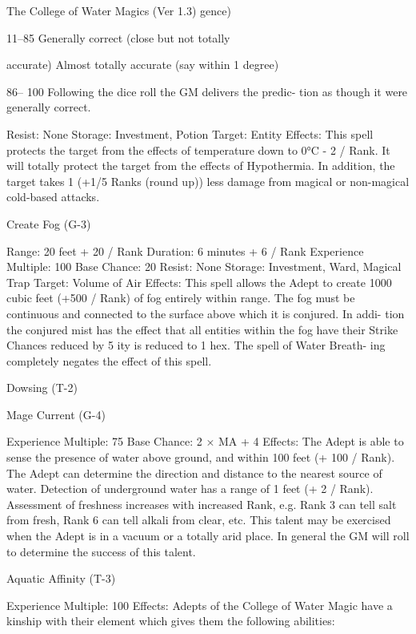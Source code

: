 \begin{Chapter}{The College of Water Magics (Ver 1.3)}
gence) 

11–85  Generally correct (close but not totally 

accurate) 
Almost totally accurate (say within 1 
degree) 

86–
100 
Following the dice roll the GM delivers the predic-
tion as though it were generally correct. 

Resist: None 
Storage: Investment, Potion 
Target: Entity 
Effects:  This  spell  protects  the  target  from  the 
effects  of  temperature  down  to  0°C  -  2  /  Rank.  It 
will  totally  protect  the  target  from  the  effects  of 
Hypothermia.  In  addition,  the  target  takes  1  (+1/5 
Ranks  (round  up))  less  damage  from  magical  or 
non-magical cold-based attacks. 

Create Fog (G-3) 

Range: 20 feet + 20 / Rank 
Duration: 6 minutes + 6 / Rank 
Experience Multiple: 100 
Base Chance: 20%
Resist: None 
Storage: Investment, Ward, Magical Trap 
Target: Volume of Air 
Effects: This spell allows the Adept to create 1000 
cubic  feet  (+500  /  Rank)  of  fog  entirely  within 
range.  The  fog  must  be  continuous  and  connected 
to  the  surface  above  which  it  is conjured.  In  addi-
tion the conjured mist has the effect that all entities 
within  the  fog  have  their  Strike  Chances  reduced 
by 5%
ity is reduced to 1 hex. The spell of Water Breath-
ing completely negates the effect of this spell. 

Dowsing (T-2) 

Mage Current (G-4) 

Experience Multiple: 75 
Base Chance: 2 × MA + 4%
Effects: The Adept is able to sense the presence of 
water  above  ground,  and  within  100  feet  (+  100  / 
Rank).  The  Adept  can determine  the direction and 
distance  to  the  nearest  source  of  water.  Detection 
of  underground  water  has  a  range  of  1  feet  (+  2  / 
Rank).  Assessment  of  freshness  increases  with 
increased  Rank,  e.g.  Rank  3  can  tell  salt  from 
fresh,  Rank  6  can  tell  alkali  from  clear,  etc.  This 
talent  may  be  exercised  when  the  Adept  is  in  a 
vacuum or  a  totally  arid  place.  In  general  the  GM 
will roll to determine the success of this talent. 

Aquatic Affinity (T-3) 

Experience Multiple: 100 
Effects:  Adepts  of  the  College  of  Water  Magic 
have a kinship with their element which gives them 
the following abilities: 


\end{Chapter}
